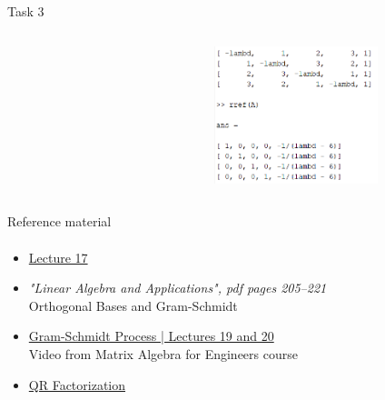 \documentclass[aspectratio=169]{beamer}
\newcommand{\fbckg}[1]{\usebackgroundtemplate{\texttt{[image: \#1]}}}%
\begin{document}
\begin{frame}[t]{Task 3}
{\begin{columns}[T,onlytextwidth]
\begin{column}{0.64\textwidth}
            \end{column}
            \begin{column}{0.35\textwidth}
                \vspace{-0.3cm}
                \begin{figure}[H]
                    \centering\includegraphics[height=4cm,width=1\textwidth,keepaspectratio]{task3_ans.png}
                    \label{fig:task3_ans.png}
                \end{figure}
            \end{column}
        \end{columns}

    }
\end{frame}

\begin{frame}[t]{Reference material}
    \framesubtitle{}
    \Large
    \begin{itemize}
        \item \href{https://www.youtube.com/watch?v=Y_Ac6KiQ1t0&list=PL49CF3715CB9EF31D&index=17}{Lecture 17}
        \item \textit{"Linear Algebra and Applications", pdf pages 205--221 }\\ Orthogonal Bases and Gram-Schmidt
        \item \href{https://www.youtube.com/watch?v=eib8uAlzegc&list=PLkZjai-2Jcxlg-Z1roB0pUwFU-P58tvOx&index=20}{Gram-Schmidt Process | Lectures 19 and 20}\\ Video from Matrix Algebra for Engineers course
        \item \href{https://www.youtube.com/watch?v=J41Ypt6Mftc}{QR Factorization}
    \end{itemize}
\end{frame}

\fbckg{fibeamer/figs/last_page.png}
\frame[plain]{}
\end{document}
